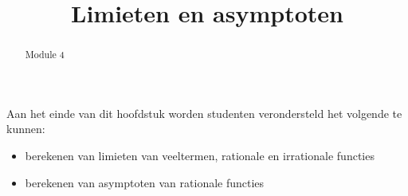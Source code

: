 \documentclass{ximera}
\title{Limieten en asymptoten}
\begin{document}
\begin{abstract}
Module 4 %
\end{abstract}

\maketitle

\begin{sectionOutcomes}

Aan het einde van dit hoofdstuk worden studenten verondersteld het volgende te kunnen:

\begin{itemize}
\item berekenen van limieten van veeltermen, rationale en irrationale functies
\item berekenen van asymptoten van rationale functies
\end{itemize}

\end{sectionOutcomes}

\end{document}
